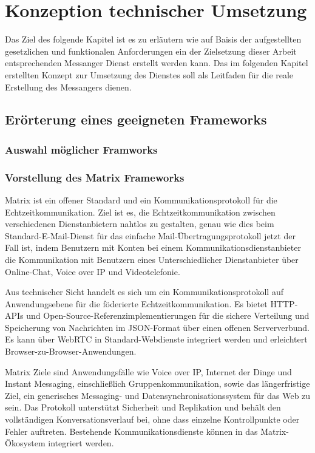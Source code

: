 \chapter{Konzeption technischer Umsetzung}\label{chapter:tanforderungen}
Das Ziel des folgende Kapitel ist es zu erläutern wie auf Baisis der aufgestellten gesetzlichen und funktionalen Anforderungen ein der Zielsetzung dieser Arbeit entsprechenden Messanger Dienst erstellt werden kann. Das im folgenden Kapitel erstellten Konzept zur Umsetzung des Dienstes soll als Leitfaden für die reale Erstellung des Messangers dienen. 

\section{Erörterung eines geeigneten Frameworks}\label{chapter:kr}

\subsection{Auswahl möglicher Framworks}\label{chapter:am}

\subsection{Vorstellung des Matrix Frameworks}\label{chapter:vdmf}
Matrix ist ein offener Standard und ein Kommunikationsprotokoll für die Echtzeitkommunikation. Ziel ist es, die Echtzeitkommunikation zwischen verschiedenen Dienstanbietern nahtlos zu gestalten, genau wie dies beim Standard-E-Mail-Dienst für das einfache Mail-Übertragungsprotokoll jetzt der Fall ist, indem Benutzern mit Konten bei einem Kommunikationsdienstanbieter die Kommunikation mit Benutzern eines Unterschiedlicher Dienstanbieter über Online-Chat, Voice over IP und Videotelefonie.

Aus technischer Sicht handelt es sich um ein Kommunikationsprotokoll auf Anwendungsebene für die föderierte Echtzeitkommunikation. Es bietet HTTP-APIs und Open-Source-Referenzimplementierungen für die sichere Verteilung und Speicherung von Nachrichten im JSON-Format über einen offenen Serververbund. Es kann über WebRTC in Standard-Webdienste integriert werden und erleichtert Browser-zu-Browser-Anwendungen.

Matrix Ziele sind Anwendungsfälle wie Voice over IP, Internet der Dinge und Instant Messaging, einschließlich Gruppenkommunikation, sowie das längerfristige Ziel, ein generisches Messaging- und Datensynchronisationssystem für das Web zu sein. Das Protokoll unterstützt Sicherheit und Replikation und behält den vollständigen Konversationsverlauf bei, ohne dass einzelne Kontrollpunkte oder Fehler auftreten. Bestehende Kommunikationsdienste können in das Matrix-Ökosystem integriert werden.

